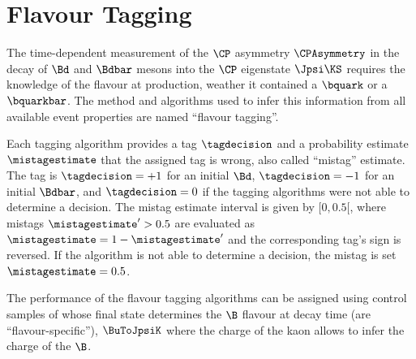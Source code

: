 
\chapter{Flavour Tagging}
\label{ch:flavour_tagging}
The time-dependent measurement of the $\CP$ asymmetry $\CPAsymmetry$ in the
decay of $\Bd$ and $\Bdbar$ mesons into the $\CP$ eigenstate $\Jpsi\KS$ requires
the knowledge of the \Bmeson flavour at production, \ie weather it contained
a $\bquark$ or a $\bquarkbar$. The method and algorithms used to infer this
information from all available event properties are named \enquote{flavour
tagging}.

Each tagging algorithm provides a tag $\tagdecision$ and a probability estimate
$\mistagestimate$ that the assigned tag is wrong, also called \enquote{mistag}
estimate. The tag is $\tagdecision=+1$ for an initial $\Bd$, $\tagdecision=-1$
for an initial $\Bdbar$, and $\tagdecision=0$ if the tagging algorithms were not
able to determine a decision. The mistag estimate interval is given by
${[0,0.5[}$, where mistags $\mistagestimate^{\prime}>0.5$ are evaluated as
$\mistagestimate = 1 - \mistagestimate^{\prime}$ and the corresponding tag's
sign is reversed. If the algorithm is not able to determine a decision, the
mistag is set $\mistagestimate=0.5$.

The performance of the flavour tagging algorithms can be assigned using control
samples of \Bmesons whose final state determines the $\B$ flavour at decay
time (\ie are \enquote{flavour-specific}), \eg $\BuToJpsiK$ where the charge of
the kaon allows to infer the charge of the $\B$.

